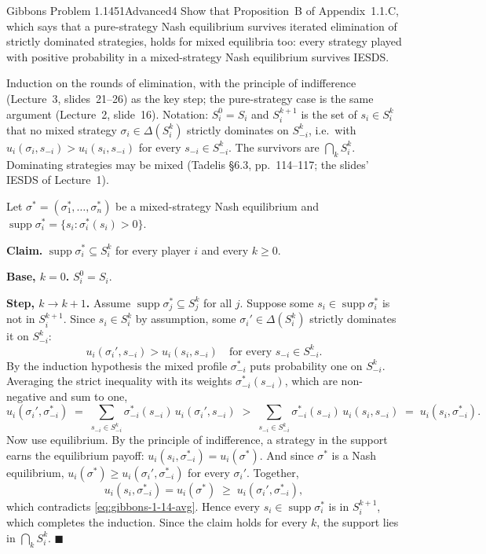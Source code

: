\begin{exsol}{Gibbons Problem 1.14}{51}{Advanced}{4}
\asked Show that Proposition~B of Appendix~1.1.C, which says that a pure-strategy Nash equilibrium
survives iterated elimination of strictly dominated strategies, holds for mixed equilibria too:
every strategy played with positive probability in a mixed-strategy Nash equilibrium survives IESDS.

\method Induction on the rounds of elimination, with the principle of indifference (Lecture~3,
slides~21--26) as the key step; the pure-strategy case is the same argument (Lecture~2, slide~16).
Notation: $S_i^0 = S_i$ and $S_i^{k+1}$ is the set of $s_i \in S_i^k$ that no mixed strategy
$\sigma_i \in \Delta(S_i^k)$ strictly dominates on $S_{-i}^k$, i.e.\ with
$u_i(\sigma_i, s_{-i}) > u_i(s_i, s_{-i})$ for every $s_{-i} \in S_{-i}^k$. The survivors are
$\bigcap_k S_i^k$. Dominating strategies may be mixed (Tadelis \S6.3, pp.~114--117; the slides' IESDS
of Lecture~1).

\solution
Let $\sigma^* = (\sigma_1^*, \dots, \sigma_n^*)$ be a mixed-strategy Nash equilibrium and
$\operatorname{supp}\sigma_i^* = \{s_i : \sigma_i^*(s_i) > 0\}$.

\textbf{Claim.} $\operatorname{supp}\sigma_i^* \subseteq S_i^k$ for every player $i$ and every $k \ge 0$.

\textbf{Base, $k = 0$.} $S_i^0 = S_i$.

\textbf{Step, $k \to k+1$.} Assume $\operatorname{supp}\sigma_j^* \subseteq S_j^k$ for all $j$. Suppose
some $s_i \in \operatorname{supp}\sigma_i^*$ is not in $S_i^{k+1}$. Since $s_i \in S_i^k$ by assumption,
some $\sigma_i' \in \Delta(S_i^k)$ strictly dominates it on $S_{-i}^k$:
\[
  u_i(\sigma_i', s_{-i}) > u_i(s_i, s_{-i}) \quad\text{for every } s_{-i} \in S_{-i}^k .
\]
By the induction hypothesis the mixed profile $\sigma_{-i}^*$ puts probability one on $S_{-i}^k$.
Averaging the strict inequality with its weights $\sigma_{-i}^*(s_{-i})$, which are non-negative and
sum to one,
\begin{equation}
  u_i(\sigma_i', \sigma_{-i}^*) \;=\; \sum_{s_{-i} \in S_{-i}^k} \sigma_{-i}^*(s_{-i})\,u_i(\sigma_i', s_{-i})
  \;>\; \sum_{s_{-i} \in S_{-i}^k} \sigma_{-i}^*(s_{-i})\,u_i(s_i, s_{-i}) \;=\; u_i(s_i, \sigma_{-i}^*).
  \label{eq:gibbons-1-14-avg}
\end{equation}
Now use equilibrium. By the principle of indifference, a strategy in the support earns the equilibrium
payoff: $u_i(s_i, \sigma_{-i}^*) = u_i(\sigma^*)$. And since $\sigma^*$ is a Nash equilibrium,
$u_i(\sigma^*) \ge u_i(\sigma_i', \sigma_{-i}^*)$ for every $\sigma_i'$. Together,
\[
  u_i(s_i, \sigma_{-i}^*) = u_i(\sigma^*) \;\ge\; u_i(\sigma_i', \sigma_{-i}^*),
\]
which contradicts \eqref{eq:gibbons-1-14-avg}. Hence every $s_i \in \operatorname{supp}\sigma_i^*$ is in
$S_i^{k+1}$, which completes the induction. Since the claim holds for every $k$, the support lies in
$\bigcap_k S_i^k$. \hfill $\blacksquare$


\end{exsol}
